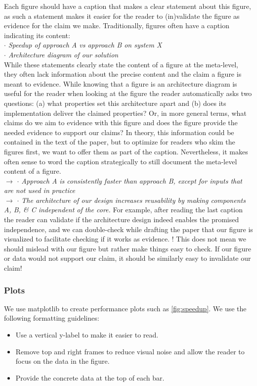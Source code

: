 \documentclass[a4paper]{article}
\newenvironment{draftonly}{}{}
\begin{document}
\begin{draftonly}
Each figure should have a caption that makes a clear statement about this
figure, as such a statement makes it easier for the reader to (in)validate the
figure as evidence for the claim we make. Traditionally, figures often have a
caption indicating its content:\\ {\color{pairedTwoDarkBlue} \textit{$\cdot$
Speedup of approach A vs approach B on system X}}\\ {\color{pairedTwoDarkBlue}
\textit{$\cdot$ Architecture diagram of our solution}}\\ While these statements
clearly state the content of a figure at the meta-level, they often lack
information about the precise content and the claim a figure is meant to
evidence. While knowing that a figure is an architecture diagram is useful for
the reader when looking at the figure the reader automatically asks two
questions: (a) what properties set this architecture apart and (b) does its
implementation deliver the claimed properties? Or, in more general terms, what
claims do we aim to evidence with this figure and does the figure provide the
needed evidence to support our claims? In theory, this information could be
contained in the text of the paper, but to optimize for readers who skim the
figures first, we want to offer them as part of the caption. Nevertheless, it
makes often sense to word the caption strategically to still document the
meta-level content of a figure.\\ $\to$ {\color{pairedFourDarkGreen}
\textit{$\cdot$ Approach A is consistently faster than approach B, except for
inputs that are not used in practice}}\\ $\to$ {\color{pairedFourDarkGreen}
\textit{$\cdot$ The architecture of our design increases reusability by making
components A, B, \& C independent of the core.}} For example, after reading the
last caption the reader can validate if the architecture design indeed enables
the promised independence, and we can double-check while drafting the paper that
our figure is visualized to facilitate checking if it works as evidence. ! This
does not mean we should mislead with our figure but rather make things easy to
check. If our figure or data would not support our claim, it should be similarly
easy to invalidate our claim!

\subsubsection{Plots} We use matplotlib to create performance
plots such as \autoref{fig:speedup}. We use the following
formatting guidelines:
\begin{itemize}
  \item Use a vertical y-label to make it easier to read.
  \item Remove top and right frames to reduce visual noise
	and allow the reader to focus on the data in the
	figure.
  \item Provide the concrete data at the top of each bar.
\end{itemize}


\end{draftonly}
\end{document}
